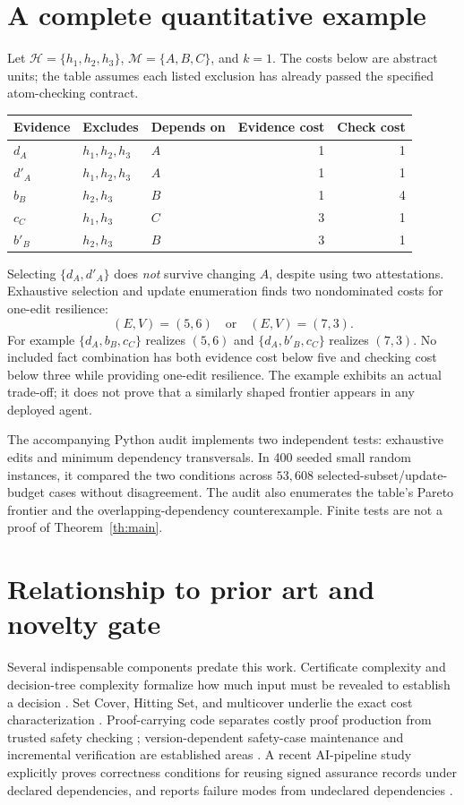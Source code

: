 \documentclass[11pt]{article}
\newcommand{\cm}{\mathcal M}\newcommand{\ch}{\mathcal H}\newcommand{\ci}{\mathcal I}
\begin{document}
\section{A complete quantitative example}
Let $\ch=\{h_1,h_2,h_3\}$, $\cm=\{A,B,C\}$, and $k=1$. The costs below are abstract units; the table assumes each listed exclusion has already passed the specified atom-checking contract.
\begin{center}\small
\begin{tabular}{@{}l l l r r@{}}\toprule
Evidence & Excludes & Depends on & Evidence cost & Check cost\\\midrule
$d_A$ & $h_1,h_2,h_3$ & $A$ & 1 & 1\\
$d'_A$ & $h_1,h_2,h_3$ & $A$ & 1 & 1\\
$b_B$ & $h_2,h_3$ & $B$ & 1 & 4\\
$c_C$ & $h_1,h_3$ & $C$ & 3 & 1\\
$b'_B$ & $h_2,h_3$ & $B$ & 3 & 1\\\bottomrule
\end{tabular}
\end{center}
Selecting $\{d_A,d'_A\}$ does \emph{not} survive changing $A$, despite using two attestations. Exhaustive selection and update enumeration finds two nondominated costs for one-edit resilience:
\[
\boxed{\quad (E,V)=(5,6)\quad\text{or}\quad (E,V)=(7,3).\quad}
\]
For example $\{d_A,b_B,c_C\}$ realizes $(5,6)$ and $\{d_A,b'_B,c_C\}$ realizes $(7,3)$. No included fact combination has both evidence cost below five and checking cost below three while providing one-edit resilience. The example exhibits an actual trade-off; it does not prove that a similarly shaped frontier appears in any deployed agent.

The accompanying Python audit implements two independent tests: exhaustive edits and minimum dependency transversals. In 400 seeded small random instances, it compared the two conditions across $53{,}608$ selected-subset/update-budget cases without disagreement. The audit also enumerates the table's Pareto frontier and the overlapping-dependency counterexample. Finite tests are not a proof of Theorem~\ref{th:main}.

\section{Relationship to prior art and novelty gate}
Several indispensable components predate this work. Certificate complexity and decision-tree complexity formalize how much input must be revealed to establish a decision \cite{cert2026}. Set Cover, Hitting Set, and multicover underlie the exact cost characterization \cite{multicover}. Proof-carrying code separates costly proof production from trusted safety checking \cite{necula1997}; version-dependent safety-case maintenance and incremental verification are established areas \cite{jaradat2014,diemert2023,summary2023}. A recent AI-pipeline study explicitly proves correctness conditions for reusing signed assurance records under declared dependencies, and reports failure modes from undeclared dependencies \cite{mukhopadhyay2026}.
\end{document}
